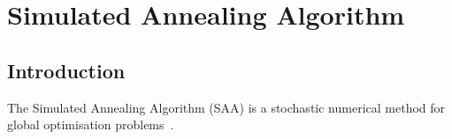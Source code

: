 \section{Simulated Annealing Algorithm}\label{Chapter:GlobalOpt:Section:SimulatedAnnealing}

\subsection{Introduction}
The Simulated Annealing Algorithm (SAA) is a stochastic numerical method for global optimisation problems~\citep[for an overview of optimisation methods, see][]{Eglese_1990,Rinnooy_1984}. 
\medskip


